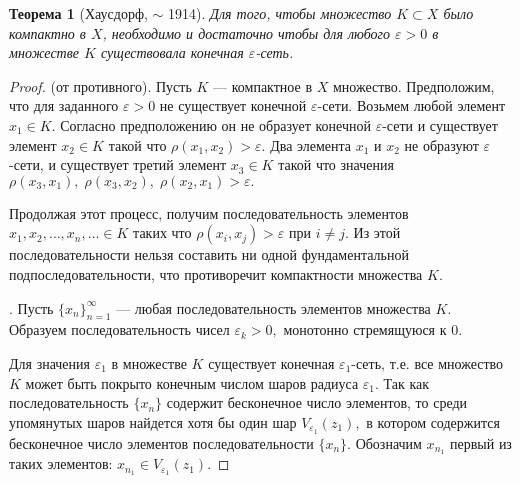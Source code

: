 \documentclass[12pt,a4paper,titlepage,oneside]{book}
\theoremstyle{definition}
\theoremstyle{plain}
\newtheorem*{theorem}{Теорема}
\theoremstyle{break}
\theoremstyle{remark}
\theoremstyle{remark}
\theoremstyle{remark}
\theoremstyle{remark}
\theoremstyle{plain}
\theoremstyle{plain}
\begin{document}
\begin{theorem}[Хаусдорф, $\sim$ 1914]
Для того, чтобы множество $K \subset X$ было компактно в $X$, необходимо и достаточно чтобы для любого $\varepsilon > 0$ в множестве $K$ существовала конечная $\varepsilon$-сеть. 
\end{theorem}
\begin{proof}

 (от противного). Пусть $K$  --- компактное в $X$ множество. Предположим, что для заданного $\varepsilon >0 $ не существует конечной $\varepsilon$-сети. Возьмем любой элемент $x_1 \in K.$ Согласно предположению он не образует конечной $\varepsilon$-сети и существует элемент $x_2 \in K$ такой что $\rho(x_1, x_2) > \varepsilon.$ Два элемента $x_1$ и $x_2$ не образуют $\varepsilon$-сети, и существует третий элемент $x_3 \in K$ такой что значения $\rho(x_3, x_1), \; \rho(x_3, x_2), \; \rho(x_2, x_1) > \varepsilon.$

Продолжая этот процесс, получим последовательность элементов $x_1,x_2, \ldots, x_n, \ldots \in K$ таких что $\rho(x_i, x_j) > \varepsilon$ при   $i \neq j$. Из этой последовательности нельзя составить ни одной фундаментальной подпоследовательности, что противоречит компактности множества $K.$

. Пусть $\{x_n\}_{n=1}^{\infty}$ --- любая последовательность элементов множества $K.$ Образуем последовательность чисел $\varepsilon _k > 0,$ монотонно стремящуюся к $0.$

Для значения $\varepsilon _1$  в множестве $K$ существует конечная $\varepsilon _1$-сеть, т.е. все множество $K$ может быть покрыто конечным числом шаров радиуса $\varepsilon _1 .$ Так как последовательность $\{ x_n \}$ содержит бесконечное число элементов, то среди упомянутых шаров найдется хотя бы один шар $V_{\varepsilon _1} (z_1),$ в котором содержится бесконечное число элементов последовательности $\{x_n\}.$ Обозначим $x_{n_1}$ первый из таких элементов: $x_{n_1} \in V_{\varepsilon _1} (z_1).$


\end{proof}
\end{document}
